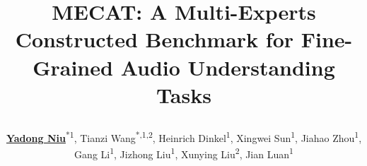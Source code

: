 


\graphicspath{{assets/}}
\title{\parbox{\linewidth}{\centering MECAT: A Multi-Experts Constructed Benchmark for Fine-Grained Audio Understanding Tasks}}
\author{\underline{\textbf{Yadong Niu}}\textsuperscript{*1},
    Tianzi Wang\textsuperscript{*,1,2},
    Heinrich Dinkel\textsuperscript{1},
    Xingwei Sun\textsuperscript{1},
    Jiahao Zhou\textsuperscript{1},
    Gang Li\textsuperscript{1},
    Jizhong Liu\textsuperscript{1},
    Xunying Liu\textsuperscript{2},
    Jian Luan\textsuperscript{1}}
\titlegraphicleft{\PosterLeftLogo}
\titlegraphic{\PosterRightLogo}

\newcommand{\PosterRepositoryUrl}{https://github.com/xiaomi-research/mecat}
\newcommand{\PosterRepositoryText}{github.com/xiaomi-research/mecat}
